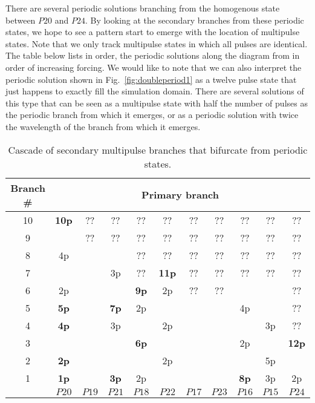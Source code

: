 \documentclass[../main/WavelengthCompetition.tex]{subfiles}
\begin{document}
There are several periodic solutions branching from the homogenous state between $P20$ and $P24$.  By looking at the secondary branches from these periodic states, we hope to see a pattern start to emerge with the location of multipulse states.  Note that we only track multipulse states in which all pulses are identical.  The table below lists in order, the periodic solutions along the diagram from in order of increasing forcing.  We would like to note that we can also interpret the periodic solution shown in Fig.~\ref{fig:doubleperiod1} as a twelve pulse state that just happens to exactly fill the simulation domain.  There are several solutions of this type that can be seen as a multipulse state with half the number of pulses as the periodic branch from which it emerges, or as a periodic solution with twice the wavelength of the branch from which it emerges.  



\begin{table}[ht]
\caption{Cascade of secondary multipulse branches that bifurcate from periodic states.} %
\centering %
\begin{tabular}{c | c c c c c c c c c c} %
\hline\hline %
 Branch \# &\multicolumn{10}{c}{ Primary branch}\\
\hline  %
10 	&\textbf{10p} &??		&??		&??		&??		&??		&??		&??		&??		&??	\\
9	&      		&??		&??		&??	 	&??		&??		&??		&??		&??		&??	\\
8	&4p  		&		&		&??	 	&??		&??		&??		&??		&??		&??	\\
7	&      		&		&3p		&??	 	&\textbf{11p}	&??		&??		&??		&??		&??	\\
6	& 2p    		&		&		&\textbf{9p} 	&2p		&??		&??		&		&		&??	\\
5	&\textbf{5p}  	&		&\textbf{7p}	&2p	 	&		&		&		&4p		&		&??	\\
4	&\textbf{4p} 	&		&3p		&	 	&2p		&		&		&		&3p		&??	\\
3	&      		&		&		&\textbf{6p} 	&		&		&		&2p		&		&\textbf{12p}	\\
2	&\textbf{2p} 	&		&		&	 	&2p		&		&		&		&5p		&	\\
1	&\textbf{1p}  	&		&\textbf{3p}	&2p	 	&		&		&		&\textbf{8p}	&3p		&2p	\\
\hline %
 	&$P20$	&$P19$	&$P21$	&$P18$	&$P22$	&$P17$	&$P23$	&$P16$	&$P15$	&$P24$ \\ [1ex] %
\hline %
\end{tabular}
\label{table:multipulse} %
\end{table} 
\end{document}
